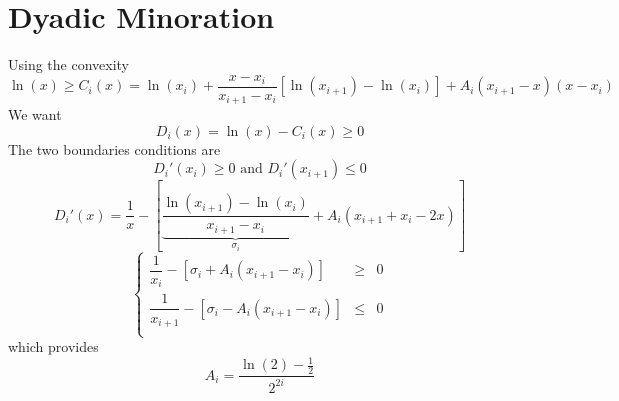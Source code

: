 \documentclass[aps]{revtex4}
\begin{document}
\section{Dyadic Minoration}
Using the convexity
\begin{equation}
 	\ln(x) \geq C_i(x) = \ln(x_i) + \dfrac{x-x_i}{x_{i+1}-{x_i}} \left[ \ln(x_{i+1}) - \ln(x_i)\right] + A_i (x_{i+1}-x)(x-x_{i})
\end{equation}
We want
\begin{equation}
D_i(x)=\ln(x)-C_i(x)\geq0
\end{equation}
The two boundaries conditions are
\begin{equation}
D_i'(x_i)\geq 0 \text{ and } D_i'(x_{i+1})\leq0
\end{equation}
\begin{equation}
	D_i'(x) = \dfrac{1}{x} - \left[ \underbrace{\dfrac{\ln(x_{i+1}) - \ln(x_i)}{x_{i+1}-x_i}}_{\sigma_i} + A_i \left(x_{i+1}+x_i-2x\right)\right]
\end{equation}
\begin{equation}
\left\lbrace
\begin{array}{rcl}
\dfrac{1}{x_i}     - \left[\sigma_i + A_i\left(x_{i+1}-x_i\right)\right] & \geq & 0 \\
\dfrac{1}{x_{i+1}} - \left[\sigma_i - A_i\left(x_{i+1}-x_i\right)\right] & \leq & 0 \\
\end{array}
\right.
\end{equation}
which provides
\begin{equation}
	A_i = \dfrac{\ln(2)-\frac{1}{2}}{2^{2i}}
\end{equation}
\end{document}
